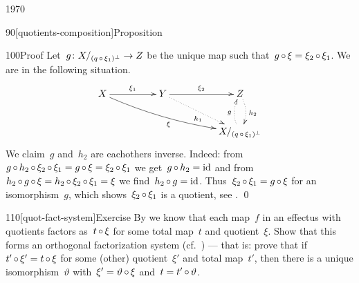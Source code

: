 \begin{parsec}{1970}
\begin{point}{90}[quotients-composition]{Proposition}
\begin{point}{100}{Proof}
Let~$g\colon X/_{(q \mathop{\circ} \xi_1)^\perp} \to Z$
    be the unique map such that~$g \mathop{\circ} \xi = \xi_2 \mathop{\circ} \xi_1$.
We are in the following situation.
\begin{equation*}
    \xymatrix@C+2pc{
        X  \ar[r]^{\xi_1} \ar@/_/[rrd]_{\xi}
        & Y \ar[r]^{\xi_2} \ar@{.>}[rd]_{h_1}
        & Z \ar@{.>}@/^/[d]^{h_2} \\
        && X/_{(q \after \xi_1)^\perp} \ar@{.>}@/^/[u]^{g}
    }
\end{equation*}
We claim~$g$ and~$h_2$ are eachothers inverse.
Indeed: from $g \mathop{\circ} h_2 \mathop{\circ} \xi_2 \mathop{\circ} \xi_1= g \mathop{\circ} \xi = \xi_2 \mathop{\circ} \xi_1$
    we get~$g \mathop{\circ} h_2 = \operatorname{id}$
    and from~$h_2 \mathop{\circ} g \mathop{\circ} \xi = h_2 \mathop{\circ} \xi_2 \mathop{\circ} \xi_1 = \xi$
    we find~$h_2 \mathop{\circ} g = \operatorname{id}$.
Thus~$\xi_2 \mathop{\circ} \xi_1 = g \mathop{\circ} \xi$ for an isomorphism~$g$,
which shows~$\xi_2 \mathop{\circ} \xi_1$ is a quotient, see . \qed
\end{point}
\end{point}
\begin{point}{110}[quot-fact-system]{Exercise}
By  we know that each
    map~$f$ in an effectus with quotients factors as~$t \mathop{\circ} \xi$
    for some total map~$t$ and quotient~$\xi$.
Show that this forms an orthogonal factorization system (cf.~\cite{korostenski1993factorization}) ---
    that is: prove that if~$t' \mathop{\circ} \xi' = t \mathop{\circ} \xi$
    for some (other) quotient~$\xi'$ and total map~$t'$,
    then there is a unique isomorphism~$\vartheta$
    with~$\xi' = \vartheta \mathop{\circ} \xi$
    and~$t = t' \mathop{\circ} \vartheta$.
\end{point}
\end{parsec}


